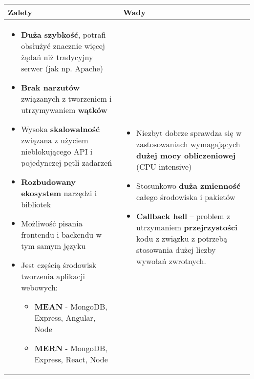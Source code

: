 \documentclass[../main.tex]{subfiles}
\begin{document}
    \begin{table}[H]
        \begin{center}
            \begin{tabular}{ p{9cm} | p{8cm} }
                \textbf{Zalety} & \textbf{Wady}\\
                \hline
                \begin{itemize}
                    \item \textbf{Duża szybkość}, potrafi obsłużyć znacznie więcej żądań niż tradycyjny serwer (jak np. Apache)
                    \item \textbf{Brak narzutów} związanych z tworzeniem i utrzymywaniem \textbf{wątków}
                    \item Wysoka \textbf{skalowalność} związana z użyciem nieblokującego API i pojedynczej pętli zadarzeń
                    \item \textbf{Rozbudowany ekosystem} narzędzi i bibliotek
                    \item Możliwość pisania frontendu i backendu w tym samym języku
                    \item Jest częścią środowisk tworzenia aplikacji webowych:
                    \begin{itemize}
                        \item \textbf{MEAN} - MongoDB, Express, Angular, Node
                        \item \textbf{MERN} - MongoDB, Express, React, Node
                    \end{itemize}
                \end{itemize}
                &
                \begin{itemize}
                    \item Niezbyt dobrze sprawdza się w zastosowaniach wymagających \textbf{dużej mocy obliczeniowej} (CPU intensive)
                    \item Stosunkowo \textbf{duża zmienność} całego środowiska i pakietów
                    \item \textbf{Callback hell} – problem z utrzymaniem \textbf{przejrzystości} kodu z związku z potrzebą stosowania dużej liczby wywołań zwrotnych.
                \end{itemize}\\
            \end{tabular}
        \end{center}
    \end{table}
\end{document}
